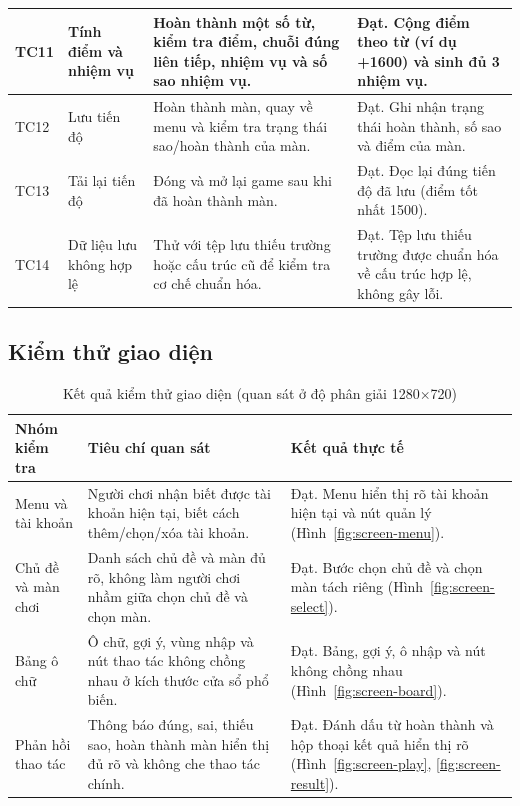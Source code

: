 \documentclass[../DoAn.tex]{subfiles}
\begin{document}
\begin{longtable}{|>{\RaggedRight\arraybackslash}p{1.5cm}|>{\RaggedRight\arraybackslash}p{3.0cm}|>{\RaggedRight\arraybackslash}p{4.5cm}|>{\RaggedRight\arraybackslash}p{4.0cm}|}
TC11 & Tính điểm và nhiệm vụ & Hoàn thành một số từ, kiểm tra điểm, chuỗi đúng liên tiếp, nhiệm vụ và số sao nhiệm vụ. & Đạt. Cộng điểm theo từ (ví dụ +1600) và sinh đủ 3 nhiệm vụ. \\ \hline
TC12 & Lưu tiến độ & Hoàn thành màn, quay về menu và kiểm tra trạng thái sao/hoàn thành của màn. & Đạt. Ghi nhận trạng thái hoàn thành, số sao và điểm của màn. \\ \hline
TC13 & Tải lại tiến độ & Đóng và mở lại game sau khi đã hoàn thành màn. & Đạt. Đọc lại đúng tiến độ đã lưu (điểm tốt nhất 1500). \\ \hline
TC14 & Dữ liệu lưu không hợp lệ & Thử với tệp lưu thiếu trường hoặc cấu trúc cũ để kiểm tra cơ chế chuẩn hóa. & Đạt. Tệp lưu thiếu trường được chuẩn hóa về cấu trúc hợp lệ, không gây lỗi. \\ \hline
\end{longtable}

\subsection{Kiểm thử giao diện}

\begin{table}[H]
\centering
\small
\begin{tabularx}{\textwidth}{|>{\RaggedRight\arraybackslash}p{3.0cm}|>{\RaggedRight\arraybackslash}X|>{\RaggedRight\arraybackslash}p{3.2cm}|}
\hline
\textbf{Nhóm kiểm tra} & \textbf{Tiêu chí quan sát} & \textbf{Kết quả thực tế} \\ \hline
Menu và tài khoản & Người chơi nhận biết được tài khoản hiện tại, biết cách thêm/chọn/xóa tài khoản. & Đạt. Menu hiển thị rõ tài khoản hiện tại và nút quản lý (Hình~\ref{fig:screen-menu}). \\ \hline
Chủ đề và màn chơi & Danh sách chủ đề và màn đủ rõ, không làm người chơi nhầm giữa chọn chủ đề và chọn màn. & Đạt. Bước chọn chủ đề và chọn màn tách riêng (Hình~\ref{fig:screen-select}). \\ \hline
Bảng ô chữ & Ô chữ, gợi ý, vùng nhập và nút thao tác không chồng nhau ở kích thước cửa sổ phổ biến. & Đạt. Bảng, gợi ý, ô nhập và nút không chồng nhau (Hình~\ref{fig:screen-board}). \\ \hline
Phản hồi thao tác & Thông báo đúng, sai, thiếu sao, hoàn thành màn hiển thị đủ rõ và không che thao tác chính. & Đạt. Đánh dấu từ hoàn thành và hộp thoại kết quả hiển thị rõ (Hình~\ref{fig:screen-play}, \ref{fig:screen-result}). \\ \hline
\end{tabularx}
\caption{Kết quả kiểm thử giao diện (quan sát ở độ phân giải 1280$\times$720)}
\label{table:ui_test_criteria}
\end{table}
\end{document}
